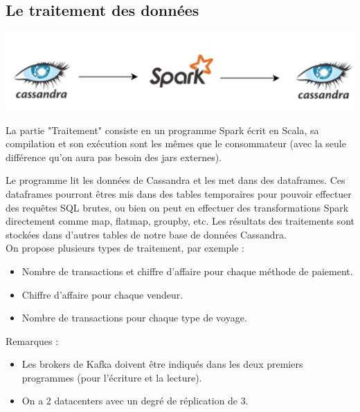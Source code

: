 \documentclass[a4paper, 11pt, titlepage]{article}
\begin{document}
\subsection {Le traitement des données}

\begin{center}
    \includegraphics[scale=0.55]{res/demo2.png}
\end{center}

La partie "Traitement" consiste en un programme Spark écrit en Scala, sa compilation et son exécution sont les mêmes que le consommateur (avec la seule différence qu'on aura pas besoin des jars externes).

Le programme lit les données de Cassandra et les met dans des dataframes. Ces dataframes pourront êtres mis dans des tables temporaires pour pouvoir effectuer des requêtes SQL brutes, ou bien on peut en effectuer des transformations Spark directement comme map, flatmap, groupby, etc.
Les résultats des traitements sont stockées dans d'autres tables de notre base de données Cassandra.\\


On propose plusieurs types de traitement, par exemple :

\begin{itemize}
\item
Nombre de transactions et chiffre d'affaire pour chaque méthode de paiement.
\item
Chiffre d'affaire pour chaque vendeur.
\item
Nombre de transactions pour chaque type de voyage.\\
\end{itemize}


Remarques :

\begin{itemize}

\item
Les brokers de Kafka doivent être indiqués dans les deux premiers programmes (pour l'écriture et la lecture).

\item
On a 2 datacenters avec un degré de réplication de 3.
 
\end{itemize}
\end{document}
